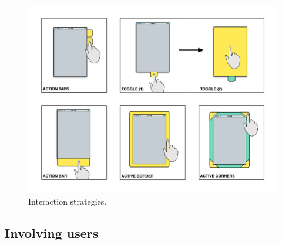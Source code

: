 
\begin{figure}[htb]
\centering
\includegraphics[width=1\linewidth]{images/strategies}
\caption{Interaction strategies.}
\label{strategies}
\end{figure}


\subsection{Involving users}

